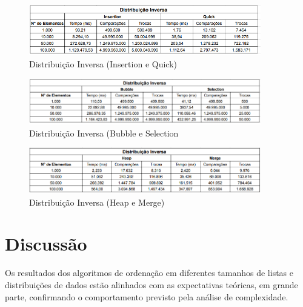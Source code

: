 \documentclass[12pt, a4paper]{report}
\begin{document}
\begin{figure}[H]
    \centering
    \includegraphics[width=0.9\textwidth]{listas/inversa1.png}
    \caption{Distribuição Inversa (Insertion e Quick)}
    \label{fig:inversa1}
\end{figure}
\begin{figure}[H]
    \centering
    \includegraphics[width=0.9\textwidth]{listas/inversa2.png}
    \caption{Distribuição Inversa (Bubble e Selection}
    \label{fig:inversa2}
\end{figure}
\begin{figure}[H]
    \centering
    \includegraphics[width=0.9\textwidth]{listas/inversa3.png}
    \caption{Distribuição Inversa (Heap e Merge)}
    \label{fig:inversa3}
\end{figure}


\chapter{Discussão}
Os resultados dos algoritmos de ordenação em diferentes tamanhos de listas e distribuições de dados estão alinhados com as expectativas teóricas, em grande parte, confirmando o comportamento previsto pela análise de complexidade.
\end{document}
